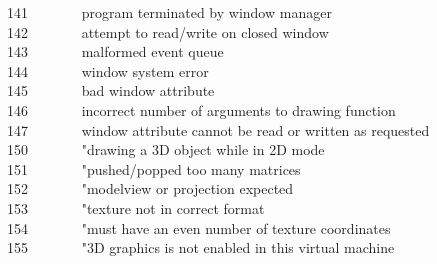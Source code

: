 141 \ \ \ \ \ \ \ program terminated by window manager\\
142 \ \ \ \ \ \ \ attempt to read/write on closed window\\
143 \ \ \ \ \ \ \ malformed event queue\\
144 \ \ \ \ \ \ \ window system error\\
145 \ \ \ \ \ \ \ bad window attribute\\
146 \ \ \ \ \ \ \ incorrect number of arguments to drawing
function\\
147 \ \ \ \ \ \ \ window attribute cannot be read or written as
requested\\
150 \ \ \ \ \ \ \ "drawing a 3D object while in 2D mode\\
151 \ \ \ \ \ \ \ "pushed/popped too many matrices\\
152 \ \ \ \ \ \ \ "modelview or projection expected\\
153 \ \ \ \ \ \ \ "texture not in correct format\\
154 \ \ \ \ \ \ \ "must have an even number of texture coordinates\\
155 \ \ \ \ \ \ \ "3D graphics is not enabled in this virtual machine\\
